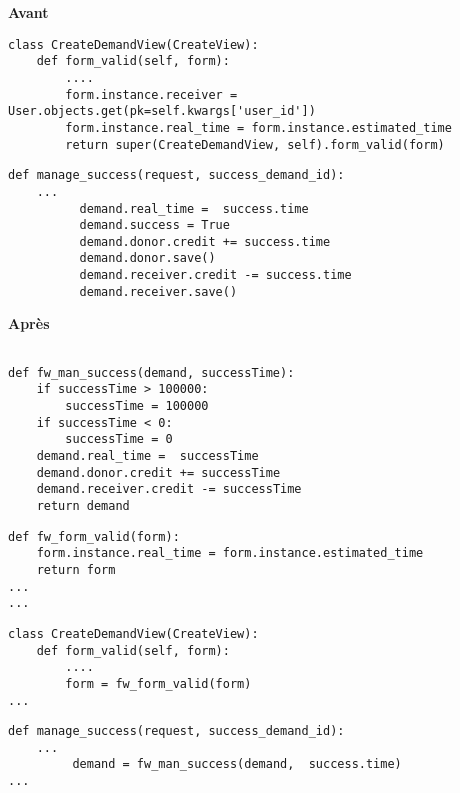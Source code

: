 \begin{minipage}{.5\textwidth}
\begin{center} \textbf{Avant}\end{center}
\begin{lstlisting}
class CreateDemandView(CreateView):
    def form_valid(self, form):
        ....
        form.instance.receiver = User.objects.get(pk=self.kwargs['user_id'])
        form.instance.real_time = form.instance.estimated_time
        return super(CreateDemandView, self).form_valid(form)
\end{lstlisting} 

\begin{lstlisting}
def manage_success(request, success_demand_id):
	...
          demand.real_time =  success.time
          demand.success = True
          demand.donor.credit += success.time
          demand.donor.save()
          demand.receiver.credit -= success.time
          demand.receiver.save()
\end{lstlisting} 
\end{minipage}
\hspace{0.3cm}
\begin{minipage}{.5\textwidth}
\begin{center} \textbf{Après}\end{center}
\begin{lstlisting}

def fw_man_success(demand, successTime):
    if successTime > 100000:
        successTime = 100000
    if successTime < 0:
        successTime = 0
    demand.real_time =  successTime
    demand.donor.credit += successTime
    demand.receiver.credit -= successTime  
    return demand
\end{lstlisting} 

\begin{lstlisting}
def fw_form_valid(form):
    form.instance.real_time = form.instance.estimated_time
    return form
...
...
\end{lstlisting} 

\begin{lstlisting}
class CreateDemandView(CreateView):
    def form_valid(self, form):
        ....
        form = fw_form_valid(form)
...
\end{lstlisting} 

\begin{lstlisting}
def manage_success(request, success_demand_id):
	...
         demand = fw_man_success(demand,  success.time)
...
\end{lstlisting} 
\end{minipage}

